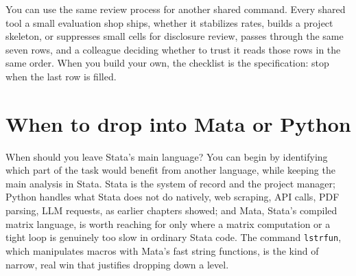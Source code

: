 You can use the same review process for another shared command. Every shared tool a small evaluation shop ships, whether it stabilizes rates, builds a project skeleton, or suppresses small cells for disclosure review, passes through the same seven rows, and a colleague deciding whether to trust it reads those rows in the same order. When you build your own, the checklist is the specification: stop when the last row is filled.

\section{When to drop into Mata or Python}
When should you leave Stata's main language? You can begin by identifying which part of the task would benefit from another language, while keeping the main analysis in Stata. Stata is the system of record and the project manager; Python handles what Stata does not do natively, web scraping, API calls, PDF parsing, LLM requests, as earlier chapters showed; and Mata, Stata's compiled matrix language, is worth reaching for only where a matrix computation or a tight loop is genuinely too slow in ordinary Stata code. The command \texttt{lstrfun}, which manipulates macros with Mata's fast string functions, is the kind of narrow, real win that justifies dropping down a level.

